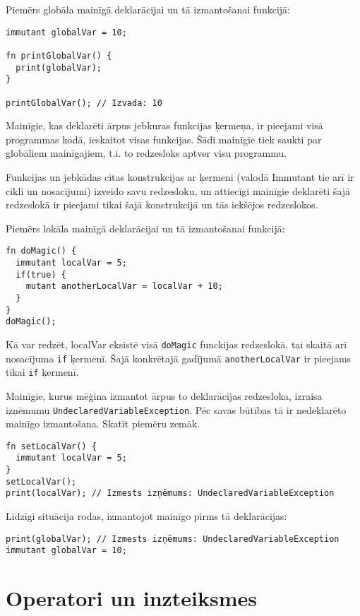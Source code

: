 \documentclass[12pt,a4paper]{report}
\begin{document}
Piemērs globāla mainīgā deklarācijai un tā izmantošanai funkcijā:

\begin{verbatim}
immutant globalVar = 10;

fn printGlobalVar() {
  print(globalVar);
}

printGlobalVar(); // Izvada: 10
\end{verbatim}

Mainīgie, kas deklarēti ārpus jebkuras funkcijas ķermeņa, ir pieejami visā programmas kodā, ieskaitot visas funkcijas. Šādi mainīgie tiek saukti par globāliem mainīgajiem, t.i. to redzesloks aptver visu programmu.

Funkcijas un jebkādas citas konstrukcijas ar ķermeni (valodā Immutant tie arī ir cikli un nosacījumi) izveido savu redzesloku, un attiecīgi mainīgie deklarēti šajā redzeslokā ir pieejami tikai šajā konstrukcijā un tās iekšējos redzeslokos.

Piemērs lokāla mainīgā deklarācijai un tā izmantošanai funkcijā:
\begin{verbatim}
fn doMagic() {
  immutant localVar = 5;
  if(true) {
    mutant anotherLocalVar = localVar + 10;
  }
}
doMagic();
\end{verbatim}

Kā var redzēt, localVar eksistē visā \texttt{doMagic} funckijas redzeslokā, tai skaitā arī nosacījuma \texttt{if} ķermenī. Šajā konkrētajā gadījumā \texttt{anotherLocalVar} ir pieejams tikai \texttt{if} ķermenī.

Mainīgie, kurus mēģina izmantot ārpus to deklarācijas redzesloka, izraisa izņēmumu \texttt{UndeclaredVariableException}. Pēc savas būtības tā ir nedeklarēto mainīgo izmantošana. Skatīt piemēru zemāk.

\begin{verbatim}
fn setLocalVar() {
  immutant localVar = 5;
}
setLocalVar();
print(localVar); // Izmests izņēmums: UndeclaredVariableException
\end{verbatim}

Līdzīgi situācija rodas, izmantojot mainīgo pirms tā deklarācijas:
\begin{verbatim}
print(globalVar); // Izmests izņēmums: UndeclaredVariableException
immutant globalVar = 10;
\end{verbatim}

\section{Operatori un inzteiksmes}
\label{section:operators}
\end{document}
